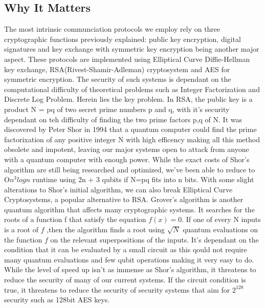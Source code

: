 \documentclass[10pt,a4paper]{article}
\begin{document}
\subsection{Why It Matters}
The most intrinsic communciation protocols we employ rely on three cryptographic functions previously explained: public key encryption, digital signatures and key exchange with symmetric key encryption being another major aspect. These protocols are implemented using Elliptical Curve Diffie-Hellman key exchange, RSA(Rivest-Shamir-Adleman) cryptosystem and AES for symmetric encryption. The security of such systems is dependant on the computational difficulty of theoretical problems such as Integer Factorization and Discrete Log Problem.
\newline
Herein lies the key problem. In RSA, the public key is a product N = pq of two secret prime numbers p and q, with it's security dependant on teh difficulty of finding the two prime factors p,q of N. It was discovered by Peter Shor in 1994 that a quantum computer could find the prime factorixation of any positive integer N with high efficency making all this method obsolete and impotent, leaving our major systems open to attack from anyone with a quantum computer with enough power. While the exact costs of Shor's algorithm are still being researched and optimized, we've been able to reduce to O\(n^3logn\) runtime using 2n + 3 qubits if N=pq fits into n bits. With some slight alterations to Shor's initial algorithm, we can also break Elliptical Curve Cryptosystems, a popular alternative to RSA. 
\newline
\newline
Grover's algorithm is another quantum algorithm that affects many cryptographic systems. It searches for the roots of a function f that satisfy the equation \(f(x) = 0\). If one of every N inputs is a root of \(f\) ,then the algorithm finds a root using \(\sqrt{N}\) quantum evaluations on the function \(f\) on the relevant superpositions of the inputs. It's dependant on the condition that it can be evaluated by a small circuit as this qould not require many quantum evaluations and few qubit operations making it very easy to do. While the level of speed up isn't as immense as Shor's algorithm, it threatens to reduce the security of many of our current systems. If the circuit condition is true, it threatens to reduce the security of security systems that aim for \(2^128\) security such as 128bit AES keys. 
\end{document}
